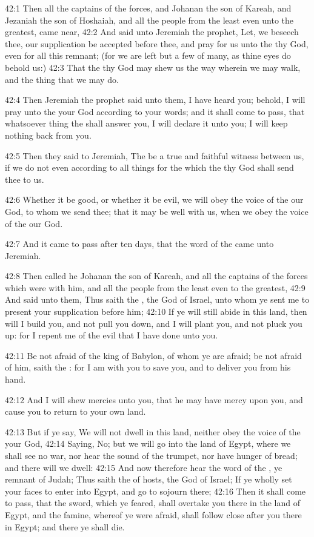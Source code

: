 42:1 Then all the captains of the forces, and Johanan the son of Kareah, and Jezaniah the son of Hoshaiah, and all the people from the least even unto the greatest, came near, 42:2 And said unto Jeremiah the prophet, Let, we beseech thee, our supplication be accepted before thee, and pray for us unto the \LORD thy God, even for all this remnant; (for we are left but a few of many, as thine eyes do behold us:) 42:3 That the \LORD thy God may shew us the way wherein we may walk, and the thing that we may do.

42:4 Then Jeremiah the prophet said unto them, I have heard you; behold, I will pray unto the \LORD your God according to your words; and it shall come to pass, that whatsoever thing the \LORD shall answer you, I will declare it unto you; I will keep nothing back from you.

42:5 Then they said to Jeremiah, The \LORD be a true and faithful witness between us, if we do not even according to all things for the which the \LORD thy God shall send thee to us.

42:6 Whether it be good, or whether it be evil, we will obey the voice of the \LORD our God, to whom we send thee; that it may be well with us, when we obey the voice of the \LORD our God.

42:7 And it came to pass after ten days, that the word of the \LORD came unto Jeremiah.

42:8 Then called he Johanan the son of Kareah, and all the captains of the forces which were with him, and all the people from the least even to the greatest, 42:9 And said unto them, Thus saith the \LORD, the God of Israel, unto whom ye sent me to present your supplication before him; 42:10 If ye will still abide in this land, then will I build you, and not pull you down, and I will plant you, and not pluck you up: for I repent me of the evil that I have done unto you.

42:11 Be not afraid of the king of Babylon, of whom ye are afraid; be not afraid of him, saith the \LORD: for I am with you to save you, and to deliver you from his hand.

42:12 And I will shew mercies unto you, that he may have mercy upon you, and cause you to return to your own land.

42:13 But if ye say, We will not dwell in this land, neither obey the voice of the \LORD your God, 42:14 Saying, No; but we will go into the land of Egypt, where we shall see no war, nor hear the sound of the trumpet, nor have hunger of bread; and there will we dwell: 42:15 And now therefore hear the word of the \LORD, ye remnant of Judah; Thus saith the \LORD of hosts, the God of Israel; If ye wholly set your faces to enter into Egypt, and go to sojourn there; 42:16 Then it shall come to pass, that the sword, which ye feared, shall overtake you there in the land of Egypt, and the famine, whereof ye were afraid, shall follow close after you there in Egypt; and there ye shall die.

